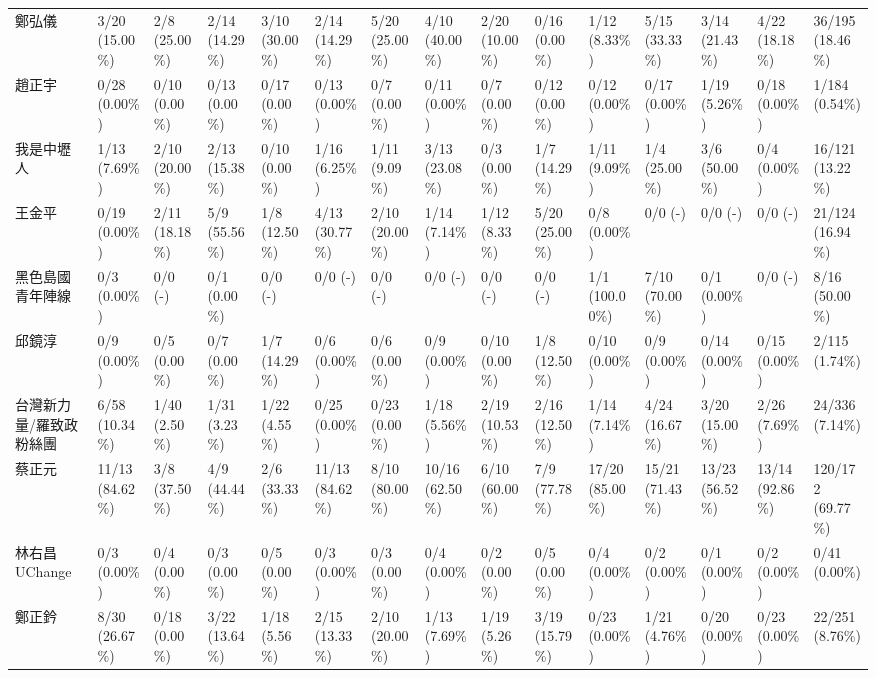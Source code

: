 \documentclass[a4paper, 10pt, conference]{ieeeconf}       %
\begin{document}
\begin{CJK}{UTF8}{bsmi}
\begin{landscape}
\begin{longtable}[c]{@{}L{2.45cm}L{1.1cm}L{1.1cm}L{1.1cm}L{1.1cm}L{1.1cm}L{1.1cm}L{1.1cm}L{1.1cm}L{1.1cm}L{1.1cm}L{1.1cm}L{1.1cm}L{1.1cm}L{1.1cm}@{}}
鄭弘儀 & 3/20 (15.00\%) & 2/8 (25.00\%) & 2/14 (14.29\%) & 3/10 (30.00\%) & 2/14 (14.29\%) & 5/20 (25.00\%) & 4/10 (40.00\%) & 2/20 (10.00\%) & 0/16 (0.00\%) & 1/12 (8.33\%) & 5/15 (33.33\%) & 3/14 (21.43\%) & 4/22 (18.18\%) & 36/195 (18.46\%) \\
趙正宇 & 0/28 (0.00\%) & 0/10 (0.00\%) & 0/13 (0.00\%) & 0/17 (0.00\%) & 0/13 (0.00\%) & 0/7 (0.00\%) & 0/11 (0.00\%) & 0/7 (0.00\%) & 0/12 (0.00\%) & 0/12 (0.00\%) & 0/17 (0.00\%) & 1/19 (5.26\%) & 0/18 (0.00\%) & 1/184 (0.54\%) \\
我是中壢人 & 1/13 (7.69\%) & 2/10 (20.00\%) & 2/13 (15.38\%) & 0/10 (0.00\%) & 1/16 (6.25\%) & 1/11 (9.09\%) & 3/13 (23.08\%) & 0/3 (0.00\%) & 1/7 (14.29\%) & 1/11 (9.09\%) & 1/4 (25.00\%) & 3/6 (50.00\%) & 0/4 (0.00\%) & 16/121 (13.22\%) \\
王金平 & 0/19 (0.00\%) & 2/11 (18.18\%) & 5/9 (55.56\%) & 1/8 (12.50\%) & 4/13 (30.77\%) & 2/10 (20.00\%) & 1/14 (7.14\%) & 1/12 (8.33\%) & 5/20 (25.00\%) & 0/8 (0.00\%) & 0/0 (-) & 0/0 (-) & 0/0 (-) & 21/124 (16.94\%) \\
黑色島國青年陣線 & 0/3 (0.00\%) & 0/0 (-) & 0/1 (0.00\%) & 0/0 (-) & 0/0 (-) & 0/0 (-) & 0/0 (-) & 0/0 (-) & 0/0 (-) & 1/1 (100.00\%) & 7/10 (70.00\%) & 0/1 (0.00\%) & 0/0 (-) & 8/16 (50.00\%) \\
邱鏡淳 & 0/9 (0.00\%) & 0/5 (0.00\%) & 0/7 (0.00\%) & 1/7 (14.29\%) & 0/6 (0.00\%) & 0/6 (0.00\%) & 0/9 (0.00\%) & 0/10 (0.00\%) & 1/8 (12.50\%) & 0/10 (0.00\%) & 0/9 (0.00\%) & 0/14 (0.00\%) & 0/15 (0.00\%) & 2/115 (1.74\%) \\
台灣新力量/羅致政粉絲團 & 6/58 (10.34\%) & 1/40 (2.50\%) & 1/31 (3.23\%) & 1/22 (4.55\%) & 0/25 (0.00\%) & 0/23 (0.00\%) & 1/18 (5.56\%) & 2/19 (10.53\%) & 2/16 (12.50\%) & 1/14 (7.14\%) & 4/24 (16.67\%) & 3/20 (15.00\%) & 2/26 (7.69\%) & 24/336 (7.14\%) \\
蔡正元 & 11/13 (84.62\%) & 3/8 (37.50\%) & 4/9 (44.44\%) & 2/6 (33.33\%) & 11/13 (84.62\%) & 8/10 (80.00\%) & 10/16 (62.50\%) & 6/10 (60.00\%) & 7/9 (77.78\%) & 17/20 (85.00\%) & 15/21 (71.43\%) & 13/23 (56.52\%) & 13/14 (92.86\%) & 120/172 (69.77\%) \\
林右昌UChange & 0/3 (0.00\%) & 0/4 (0.00\%) & 0/3 (0.00\%) & 0/5 (0.00\%) & 0/3 (0.00\%) & 0/3 (0.00\%) & 0/4 (0.00\%) & 0/2 (0.00\%) & 0/5 (0.00\%) & 0/4 (0.00\%) & 0/2 (0.00\%) & 0/1 (0.00\%) & 0/2 (0.00\%) & 0/41 (0.00\%) \\
鄭正鈐 & 8/30 (26.67\%) & 0/18 (0.00\%) & 3/22 (13.64\%) & 1/18 (5.56\%) & 2/15 (13.33\%) & 2/10 (20.00\%) & 1/13 (7.69\%) & 1/19 (5.26\%) & 3/19 (15.79\%) & 0/23 (0.00\%) & 1/21 (4.76\%) & 0/20 (0.00\%) & 0/23 (0.00\%) & 22/251 (8.76\%) \\

\end{longtable}
\end{landscape}
\end{CJK}
\end{document}
